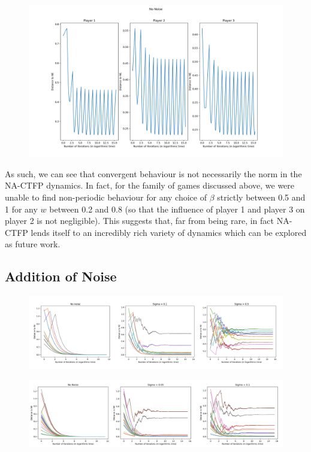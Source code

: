 \documentclass{article}
\theoremstyle{definition}
\begin{document}
  \begin{figure}[t]
    \centering
    \includegraphics[width = 0.7 \textwidth]{Figures/3PlayerChainNoNoise.png}
    \caption{\label{fig::3PlayerChainNoNoise}}
  \end{figure}

  As such, we can see that convergent behaviour is not necessarily the norm in the NA-CTFP dynamics. In fact, for the family of games discussed above, we were unable to find non-periodic behaviour for any choice of $\beta$ strictly between 0.5 and 1 for any $w$ between 0.2 and 0.8 (so that the influence of player 1 and player 3 on player 2 is not negligible). This suggests that, far from being rare, in fact NA-CTFP lends itself to an incredibly rich variety of dynamics which can be explored as future work.
  

  \subsection{Addition of Noise}

  \begin{figure}[t]
    \centering
    \includegraphics[width = \columnwidth]{Figures/Noise10Player.png}
    \caption{\label{fig::Noise10Player}}
  \end{figure}

  \begin{figure}[t]
    \centering
    \includegraphics[width = \columnwidth]{Figures/Noise20Player.png}
    \caption{\label{fig::Noise20Player}}
  \end{figure}
\end{document}
